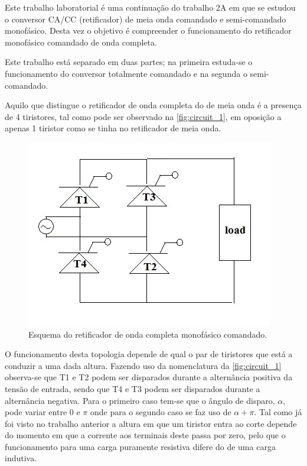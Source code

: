\documentclass[a4paper,11pt]{article}
\numberwithin{equation}{section}
\begin{document}
Este trabalho laboratorial é uma continuação do trabalho 2A em que se estudou o conversor CA/CC (retificador) de meia onda comandado e semi-comandado monofásico. Desta vez o objetivo é compreender o funcionamento do retificador monofásico comandado de onda completa.

Este trabalho está separado em duas partes; na primeira estuda-se o funcionamento do conversor totalmente comandado e na segunda o semi-comandado.

Aquilo que distingue o retificador de onda completa do de meia onda é a presença de 4 tiristores, tal como pode ser observado na \autoref{fig:circuit_1}, em oposição a apenas 1 tiristor como se tinha no retificador de meia onda.


\begin{figure}[h]
	\centering
	\includegraphics[keepaspectratio=true, scale=0.8]{img/circuito.png}
	\caption{Esquema do retificador de onda completa monofásico comandado.}
	\label{fig:circuit_1}
	\vspace{-0.8em}
\end{figure}

O funcionamento desta topologia depende de qual o par de tiristores que está a conduzir a uma dada altura. Fazendo uso da nomenclatura da \autoref{fig:circuit_1} observa-se que T1 e T2 podem ser disparados durante a alternância positiva da tensão de entrada, sendo que T4 e T3 podem ser disparados durante a alternância negativa. \cite{Silva} Para o primeiro caso tem-se que o ângulo de disparo, $\alpha$, pode variar entre $0$ e $\pi$ onde para o segundo caso se faz uso de $\alpha + \pi$. Tal como já foi visto no trabalho anterior a altura em que um tiristor entra ao corte depende do momento em que a corrente aos terminais deste passa por zero, pelo que o funcionamento para uma carga puramente resistiva difere do de uma carga indutiva.
\end{document}
